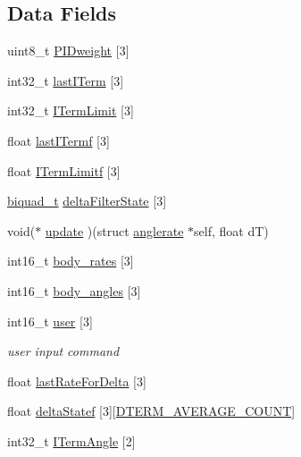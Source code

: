 \subsection*{Data Fields}
\begin{DoxyCompactItemize}
\item 
uint8\+\_\+t \hyperlink{structanglerate_af067ec7680ad2ae0127d7f904abdcb0e}{P\+I\+Dweight} \mbox{[}3\mbox{]}
\item 
int32\+\_\+t \hyperlink{structanglerate_ae9bc7a1b87c4ac7b00372a2d366ee040}{last\+I\+Term} \mbox{[}3\mbox{]}
\item 
int32\+\_\+t \hyperlink{structanglerate_a07c045ea44bd11d63fd025664da5fa49}{I\+Term\+Limit} \mbox{[}3\mbox{]}
\item 
float \hyperlink{structanglerate_a300d0a43ea110b10c06ef420e9eb4c35}{last\+I\+Termf} \mbox{[}3\mbox{]}
\item 
float \hyperlink{structanglerate_a3045a46c37820e7eb48530bbec4b9e20}{I\+Term\+Limitf} \mbox{[}3\mbox{]}
\item 
\hyperlink{filter_8h_a7256a3fa62e7894f819ddd905006ad2e}{biquad\+\_\+t} \hyperlink{structanglerate_a3d49268a9f4578c40955aa80f062b3b1}{delta\+Filter\+State} \mbox{[}3\mbox{]}
\item 
void($\ast$ \hyperlink{structanglerate_a451594ac6c3fc331c36e1dc8ed3d928d}{update} )(struct \hyperlink{structanglerate}{anglerate} $\ast$self, float d\+T)
\item 
int16\+\_\+t \hyperlink{structanglerate_a7fa2ff32b7d5254518fb306972595744}{body\+\_\+rates} \mbox{[}3\mbox{]}
\item 
int16\+\_\+t \hyperlink{structanglerate_aef3bee5f62f2b945b9ad2e1addf0ec40}{body\+\_\+angles} \mbox{[}3\mbox{]}
\item 
int16\+\_\+t \hyperlink{structanglerate_ad75fb5013c76c41ae7ddd01658469b99}{user} \mbox{[}3\mbox{]}
\begin{DoxyCompactList}\small\item\em user input command \end{DoxyCompactList}\item 
float \hyperlink{structanglerate_a621d3cb26d7611e043342c5b2d93e88b}{last\+Rate\+For\+Delta} \mbox{[}3\mbox{]}
\item 
float \hyperlink{structanglerate_ad485d2221d96b593479ce93bdd775e80}{delta\+Statef} \mbox{[}3\mbox{]}\mbox{[}\hyperlink{group__anglerate_ga383105226fdce00e3639d6ff47932a0c}{D\+T\+E\+R\+M\+\_\+\+A\+V\+E\+R\+A\+G\+E\+\_\+\+C\+O\+U\+N\+T}\mbox{]}
\item 
int32\+\_\+t \hyperlink{structanglerate_a72503f633d6abdc31bff77302164c309}{I\+Term\+Angle} \mbox{[}2\mbox{]}

\end{DoxyCompactItemize}

